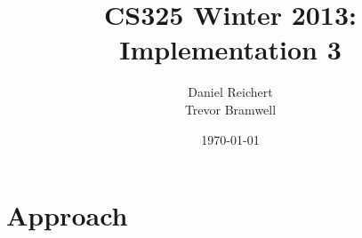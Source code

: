 \documentclass[12pt]{article}
\title{CS325 Winter 2013: Implementation 3}
\author{
    Daniel Reichert \\
    Trevor Bramwell
}
\date{\today}
\begin{document}
\maketitle

\section*{Approach}
\end{document}
